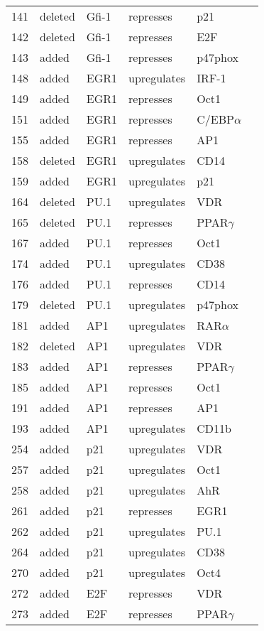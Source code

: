 \begin{center}
\begin{scriptsize}
\begin{supertabular}{|p{2 cm}|p{2cm}|p{3cm}|p{2.5cm}|p{2cm}|p{1.5cm}|}
141 &  deleted &  Gfi-1  & represses & p21 & \\
142 &  deleted &  Gfi-1  & represses & E2F & \\
143 &  added &  Gfi-1  & represses & p47phox & \\
148 &  added &  EGR1  & upregulates &  IRF-1 & \\
149 &  added &  EGR1  & represses & Oct1 & \\
151 &  added &  EGR1  & represses &C/EBP$\alpha$ & \\
155 &  added &  EGR1  & represses & AP1 & \\
158 &  deleted &  EGR1  & upregulates &  CD14 & \\
159 &  added &  EGR1  & upregulates &  p21 & \\
164 &  deleted &  PU.1  & upregulates &  VDR & \\
165 &  deleted &  PU.1  & represses & PPAR$\gamma$ & \\
167 &  added &  PU.1  & represses & Oct1 & \\
174 &  added &  PU.1  & upregulates &  CD38 & \\
176 &  added &  PU.1  & represses & CD14 & \\
179 &  deleted &  PU.1  & upregulates &  p47phox & \\
181 &  added &  AP1  & upregulates &  RAR$\alpha$ & \\
182 &  deleted &  AP1  & upregulates &  VDR & \\
183 &  added &  AP1  & represses & PPAR$\gamma$ & \cite{Wang2002}\\
185 &  added &  AP1  & represses & Oct1 & \\
191 &  added &  AP1  & represses & AP1 & \\
193 &  added &  AP1  & upregulates &  CD11b & \\
254 &  added &  p21  & upregulates &  VDR & \\
257 &  added &  p21  & upregulates &  Oct1 & \\
258 &  added &  p21  & upregulates &  AhR & \\
261 &  added &  p21  & represses & EGR1 & \\
262 &  added &  p21  & upregulates &  PU.1 & \\
264 &  added &  p21  & upregulates &  CD38 & \\
270 &  added &  p21  & upregulates &  Oct4 & \\
272 &  added &  E2F  & represses & VDR & \\
273 &  added &  E2F  & represses & PPAR$\gamma$ & \\

\end{supertabular}
\end{scriptsize}
\end{center}
